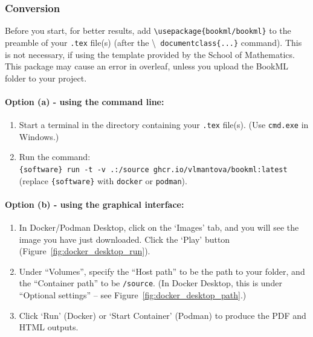 \subsubsection{Conversion}
\label{sssec:conversion}

Before you start, for better results, add \verb|\usepackage{bookml/bookml}| to the preamble of your \verb|.tex| file(s) (after the \textbackslash\verb| documentclass{...}| command). This is not necessary, if using the template provided by the School of Mathematics. This package may cause an error in overleaf, unless you upload the BookML folder to your project.

\paragraph{Option (a) - using the command line:}

\begin{enumerate}
    \item Start a terminal in the directory containing your \verb|.tex| file(s). (Use \verb|cmd.exe| in Windows.)
    \item Run the command:\\
        \verb|{software} run -t -v .:/source ghcr.io/vlmantova/bookml:latest|\\
        (replace \verb|{software}| with \verb|docker| or \verb|podman|).
\end{enumerate}

\paragraph{Option (b) - using the graphical interface:}

\begin{enumerate}
    \item In Docker/Podman Desktop, click on the `Images' tab, and you will see the image you have just downloaded. Click the `Play' button (Figure~\ref{fig:docker_desktop_run}).
    \item Under ``Volumes'', specify the ``Host path'' to be the path to your folder, and the ``Container path'' to be \verb|/source|. (In Docker Desktop, this is under ``Optional settings'' -- see Figure~\ref{fig:docker_desktop_path}.)
    \item Click `Run' (Docker) or `Start Container' (Podman) to produce the PDF and HTML outputs.
\end{enumerate}

